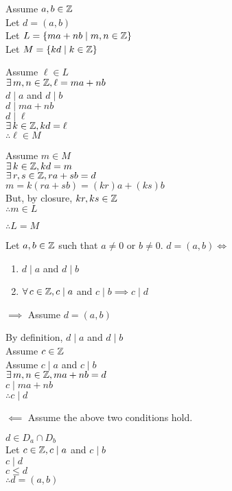 \documentclass[letterpaper,12pt,fleqn]{article}
\begin{document}
\begin{theproof}
  Assume $a,b\in\mathbb{Z}$ \\
  Let $d=(a,b)$ \\
  Let $L=\{ma+nb\mid m,n\in\mathbb{Z}\}$ \\
  Let $M=\{kd\mid k\in\mathbb{Z}\}$

  \begin{minipage}[t]{3in}
    Assume $\ell\in L$ \\
    $\exists\,m,n\in\mathbb{Z},\ell=ma+nb$ \\
    $d\mid a$ and $d\mid b$ \\
    $d\mid ma+nb$ \\
    $d\mid\ell$ \\
    $\exists\,k\in\mathbb{Z},kd=\ell$ \\
    $\therefore\ell\in M$
  \end{minipage}
  \begin{minipage}[t]{3in}
    Assume $m\in M$ \\
    $\exists\,k\in\mathbb{Z},kd=m$ \\
    $\exists\,r,s\in\mathbb{Z},ra+sb=d$ \\
    $m=k(ra+sb)=(kr)a+(ks)b$ \\
    But, by closure, $kr,ks\in\mathbb{Z}$ \\
    $\therefore m\in L$
  \end{minipage}

  \bigskip
  
  $\therefore L=M$
\end{theproof}

\begin{theorem}
  Let $a,b\in\mathbb{Z}$ such that $a\ne0$ or $b\ne0$. $d=(a,b)\iff$
  \begin{enumerate}
  \item $d\mid a$ and $d\mid b$
  \item $\forall\,c\in\mathbb{Z},c\mid a$ and $c\mid b\implies c\mid d$
  \end{enumerate}
\end{theorem}

\begin{theproof}
  \listbreak
  \begin{description}
  \item $\implies$ Assume $d=(a,b)$

    By definition, $d\mid a$ and $d\mid b$ \\
    Assume $c\in\mathbb{Z}$ \\
    Assume $c\mid a$ and $c\mid b$ \\
    $\exists\,m,n\in\mathbb{Z},ma+nb=d$ \\
    $c\mid ma+nb$ \\
    $\therefore c\mid d$
    
  \item $\impliedby$ Assume the above two conditions hold.

    $d\in D_a\cap D_b$ \\
    Let $c\in\mathbb{Z},c\mid a$ and $c\mid b$ \\
    $c\mid d$ \\
    $c\le d$ \\
    $\therefore d=(a,b)$
  \end{description}
\end{theproof}
\end{document}
